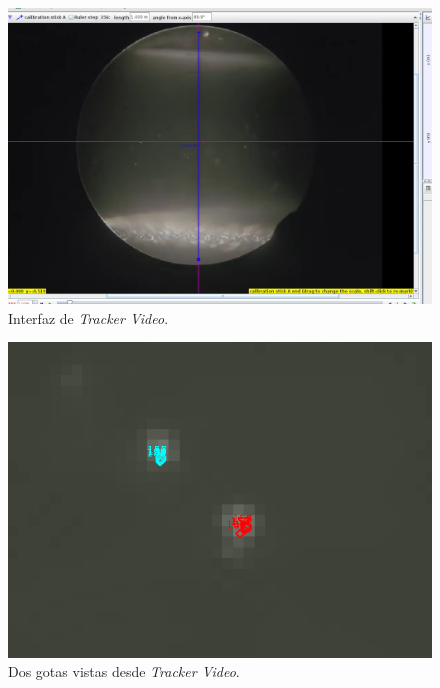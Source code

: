 \begin{figure}[htbp!]
    \centering
    \includegraphics[width=0.8\linewidth]{./images/tracker-set-up.png}
    \caption{Interfaz de \emph{Tracker Video}.}
    \label{fig:Tracker}
\end{figure}

\begin{figure}
    \centering
    \includegraphics[width=0.8\linewidth]{./images/drop-tracker.png}
    \caption{Dos gotas vistas desde \emph{Tracker Video}.}
    \label{fig:drop-tracker}
\end{figure}

